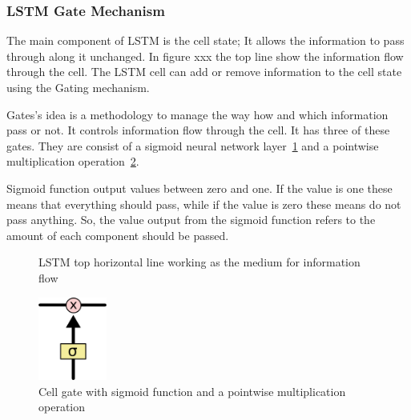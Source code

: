 

\subsubsection{LSTM Gate Mechanism}

The main component of LSTM is the cell state; It allows the information to pass through along it unchanged. In figure xxx the top line show the information flow through the cell. The LSTM cell can add or remove information to the cell state using the Gating mechanism. 

Gates's idea is a methodology to manage the way how and which information pass or not. It controls information flow through the cell. It has three of these gates. They are consist of a sigmoid neural network layer~\ref{fig:LSTM-Cell-state} and a pointwise multiplication operation~\ref{fig:LSTM-gate}.

Sigmoid function output values between zero and one. If the value is one these means that everything should pass, while if the value is zero these means do not pass anything. So, the value output from the sigmoid function refers to the amount of each component should be passed.

      \begin{figure}[ht!]
    \centering

        \caption{LSTM top horizontal line working as the medium for information flow~\cite{colah}}
      \label{fig:LSTM-Cell-state}
      \end{figure}

      
\begin{figure}[ht!]
    \centering
    \includegraphics[width=0.2\textwidth]{./Figures/Ch_2_Background/LSTM-gate.png}
        \caption{Cell gate with sigmoid function and a pointwise multiplication operation~\cite{colah}}
        \label{fig:LSTM-gate}
\end{figure}

